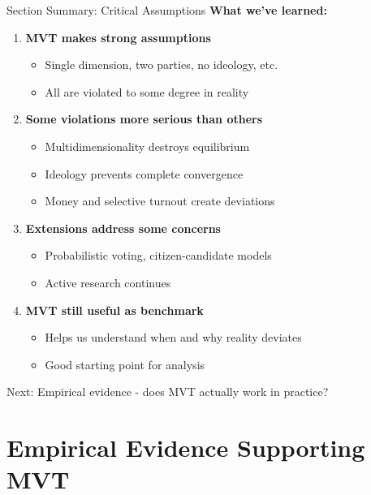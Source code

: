 \documentclass[10pt]{beamer}
\begin{document}
\begin{frame}{Section Summary: Critical Assumptions}
\textbf{What we've learned:}

\begin{enumerate}
\item \textbf{MVT makes strong assumptions}
\begin{itemize}
\item Single dimension, two parties, no ideology, etc.
\item All are violated to some degree in reality
\end{itemize}


\item \textbf{Some violations more serious than others}
\begin{itemize}
\item Multidimensionality destroys equilibrium
\item Ideology prevents complete convergence
\item Money and selective turnout create deviations
\end{itemize}


\item \textbf{Extensions address some concerns}
\begin{itemize}
\item Probabilistic voting, citizen-candidate models
\item Active research continues
\end{itemize}


\item \textbf{MVT still useful as benchmark}
\begin{itemize}
\item Helps us understand when and why reality deviates
\item Good starting point for analysis
\end{itemize}
\end{enumerate}



\alert{Next:} Empirical evidence - does MVT actually work in practice?
\end{frame}


\section{Empirical Evidence Supporting MVT}
\end{document}
